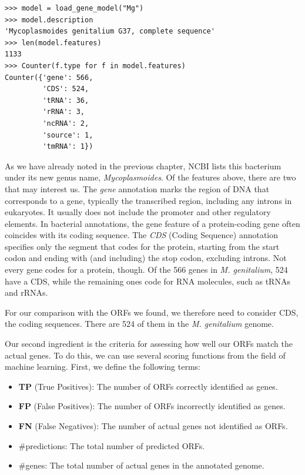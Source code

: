 \vspace*{3mm}
\begin{lstlisting}
>>> model = load_gene_model("Mg")
>>> model.description
'Mycoplasmoides genitalium G37, complete sequence'
>>> len(model.features)
1133
>>> Counter(f.type for f in model.features)
Counter({'gene': 566,
         'CDS': 524,
         'tRNA': 36,
         'rRNA': 3,
         'ncRNA': 2,
         'source': 1,
         'tmRNA': 1})
\end{lstlisting}

As we have already noted in the previous chapter, NCBI lists this bacterium under its new genus name, {\em Mycoplasmoides}. Of the features above, there are two that may interest us. The {\em gene} annotation marks the region of DNA that corresponds to a gene, typically the transcribed region, including any introns in eukaryotes. It usually does not include the promoter and other regulatory elements. In bacterial annotations, the gene feature of a protein-coding gene often coincides with its coding sequence. The {\em CDS} (Coding Sequence) annotation specifies only the segment that codes for the protein, starting from the start codon and ending with (and including) the stop codon, excluding introns. Not every gene codes for a protein, though. Of the 566 genes in {\em M. genitalium}, 524 have a CDS, while the remaining ones code for RNA molecules, such as tRNAs and rRNAs.

For our comparison with the ORFs we found, we therefore need to consider CDS, the coding sequences. There are 524 of them in the {\em M. genitalium} genome.

Our second ingredient is the criteria for assessing how well our ORFs match the actual genes. To do this, we can use several scoring functions from the field of machine learning. First, we define the following terms:

\begin{itemize}
    \item \textbf{TP} (True Positives): The number of ORFs correctly identified as genes.
    \item \textbf{FP} (False Positives): The number of ORFs incorrectly identified as genes.
    \item \textbf{FN} (False Negatives): The number of actual genes not identified as ORFs.
    \item \#predictions: The total number of predicted ORFs.
    \item \#genes: The total number of actual genes in the annotated genome.
\end{itemize}

